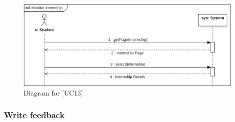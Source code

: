\begin{figure} [H]
    \centering
    \includegraphics[width=1\linewidth]{Use Cases Images/monitor_internship.png}
    \caption{Diagram for [UC13]}
    \label{fig: Monitor Internship Diagram}
\end{figure}

\subsubsection*{Write feedback}
